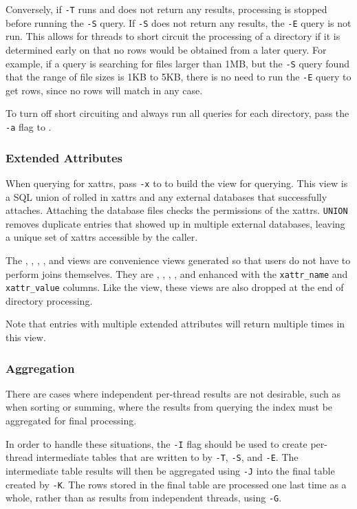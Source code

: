 Conversely, if \texttt{-T} runs and does not return any results,
processing is stopped before running the \texttt{-S} query. If
\texttt{-S} does not return any results, the \texttt{-E} query is not
run. This allows for threads to short circuit the processing of a
directory if it is determined early on that no rows would be obtained
from a later query. For example, if a query is searching for files
larger than 1MB, but the \texttt{-S} query found that the range of
file sizes is 1KB to 5KB, there is no need to run the \texttt{-E}
query to get rows, since no rows will match in any case.

To turn off short circuiting and always run all queries for each
directory, pass the \texttt{-a} flag to \gufiquery.

\subsubsection{Extended Attributes}
When querying for xattrs, pass \texttt{-x} to \gufiquery to build the
\xattrs view for querying. This view is a SQL union of rolled in
xattrs and any external databases that successfully
attaches. Attaching the database files checks the permissions of the
xattrs. \texttt{UNION} removes duplicate entries that showed up in
multiple external databases, leaving a unique set of xattrs accessible
by the caller.

The \xentries, \xpentries, \xsummary, \vrxpentries, and \vrxsummary
views are convenience views generated so that users do not have to
perform joins themselves. They are \entries, \pentries, \summary,
\vrpentries, and \vrsummary enhanced with the \texttt{xattr\_name} and
\texttt{xattr\_value} columns. Like the \xattrs view, these views are
also dropped at the end of directory processing.

Note that entries with multiple extended attributes will return
multiple times in this view.

\subsubsection{Aggregation}
There are cases where independent per-thread results are not
desirable, such as when sorting or summing, where the results from
querying the index must be aggregated for final processing.

In order to handle these situations, the \texttt{-I} flag should be
used to create per-thread intermediate tables that are written to by
\texttt{-T}, \texttt{-S}, and \texttt{-E}. The intermediate table
results will then be aggregated using \texttt{-J} into the final table
created by \texttt{-K}. The rows stored in the final table are
processed one last time as a whole, rather than as results from
independent threads, using \texttt{-G}.


